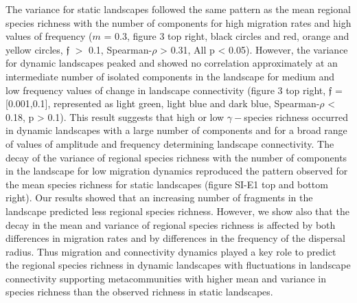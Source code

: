 \documentclass[12pt]{article}
\begin{document}
    The variance for static landscapes followed the same pattern as the mean regional species richness with the number of components for high migration rates and high values of frequency ($m$ = 0.3, figure 3 top right, black circles and red, orange and yellow circles, $\mathfrak{f}$ $>$ 0.1, Spearman-$\rho$ > 0.31, All p < 0.05). However, the variance for dynamic landscapes peaked and showed no correlation approximately at an intermediate number of isolated components in the landscape for medium and low frequency values of change in landscape connectivity (figure 3 top right, $\mathfrak{f}$ = [0.001,0.1], represented as light green, light blue and dark blue, Spearman-$\rho$ < 0.18, p > 0.1). This result suggests that high or low $\gamma-$species richness occurred in dynamic landscapes with a large number of components and for a broad range of values of amplitude and frequency determining landscape connectivity. The decay of the variance of regional species richness with the number of components in the landscape for low migration dynamics reproduced the pattern observed for the mean species richness for static landscapes (figure SI-E1 top and bottom right). Our results showed that an increasing number of fragments in the landscape predicted less regional species richness. However, we show also that the decay in the mean and variance of regional species richness is affected by both differences in migration rates and by differences in the frequency of the dispersal radius. Thus migration and connectivity dynamics played a key role to predict the regional species richness in dynamic landscapes with fluctuations in landscape connectivity supporting metacommunities with higher mean and variance in species richness than the observed richness in static landscapes. 
    
\end{document}

